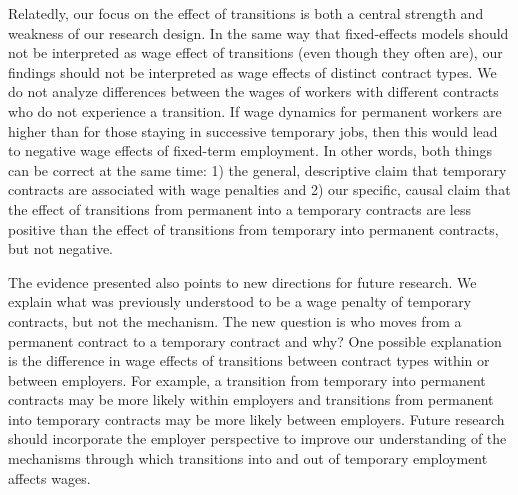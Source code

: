 \documentclass[12pt]{article}
\begin{document}
Relatedly, our focus on the effect of transitions is both a central strength and weakness of our research design.  In the same way that fixed-effects models should not be interpreted as wage effect of transitions (even though they often are), our findings should not be interpreted as wage effects of distinct contract types.  We do not analyze differences between the wages of workers with different contracts who do not experience a transition.  If wage dynamics for permanent workers are higher than for those staying in successive temporary jobs, then this would lead to negative wage effects of fixed-term employment.  In other words, both things can be correct at the same time: 1) the general, descriptive claim that temporary contracts are associated with wage penalties and 2) our specific, causal claim that the effect of transitions from permanent into a temporary contracts are less positive than the effect of transitions from temporary into permanent contracts, but not negative.

The evidence presented also points to new directions for future research.  We explain what was previously understood to be a wage penalty of temporary contracts, but not the mechanism.  The new question is who moves from a permanent contract to a temporary contract and why?  One possible explanation is the difference in wage effects of transitions between contract types within or between employers.  For example, a transition from temporary into permanent contracts may be more likely within employers and transitions from permanent into temporary contracts may be more likely between employers.  Future research should incorporate the employer perspective to improve our understanding of the mechanisms through which transitions into and out of temporary employment affects wages.







\clearpage
\singlespacing





\end{document}
